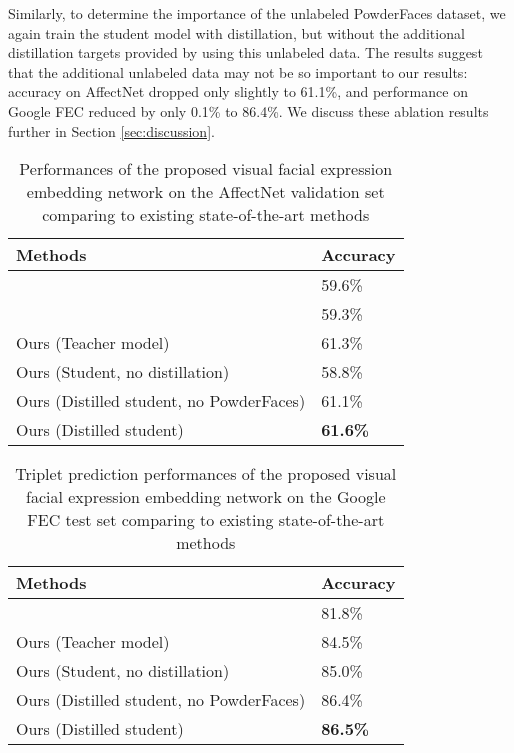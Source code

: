 \documentclass[times,twocolumn,final,authoryear]{elsarticle}
\begin{document}
	Similarly, to determine the importance of the unlabeled PowderFaces dataset, we again train the student model with distillation, but without the additional distillation targets provided by using this unlabeled data. The results suggest that the additional unlabeled data may not be so important to our results: accuracy on AffectNet dropped only slightly to 61.1\%, and performance on Google FEC reduced by only 0.1\% to 86.4\%. We discuss these ablation results further in Section \ref{sec:discussion}.
	
	\begin{table} \caption{Performances of the proposed visual facial expression embedding network on the AffectNet validation set comparing to existing state-of-the-art methods}
		\begin{tabular*}{\columnwidth}{l|l} 
			\hline 
			\textbf{Methods} & \textbf{Accuracy}\\
			\hline
			\cite{Georgescu2019}& 59.6\%\\
			
			\cite{Siqueira2020}& 59.3\%\\
			
			Ours (Teacher model) & 61.3\%\\
			
			Ours (Student, no distillation) & 58.8\%\\
			
			Ours (Distilled student, no PowderFaces) & 61.1\%\\
			
			Ours (Distilled student) &  \textbf{61.6\%}\\
			\hline
		\end{tabular*}
		\label{tab:affectnet_results}
	\end{table}
	
	\begin{table}
		\caption{Triplet prediction performances of the proposed visual facial expression embedding network on the Google FEC test set comparing to existing state-of-the-art methods }
		\begin{tabular*}{\columnwidth}{l|l} 
			\hline
			\textbf{Methods} & \textbf{Accuracy} \\
			\hline
			\cite{GoogleFEC}& 81.8\% \\
			Ours (Teacher model) & 84.5\% \\
			Ours (Student, no distillation) & 85.0\% \\
			Ours (Distilled student, no PowderFaces) & 86.4\% \\
			Ours (Distilled student) & \textbf{86.5\%}\\
			\hline
		\end{tabular*}
		
		\label{tab:fec_results}
	\end{table}
	
\end{document}
